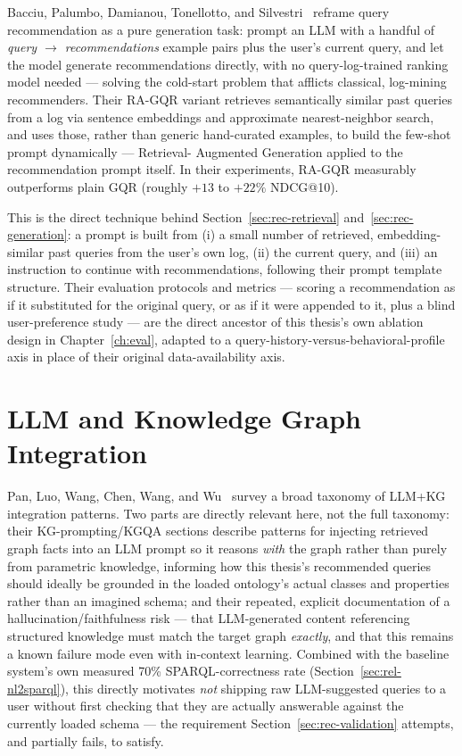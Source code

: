 Bacciu, Palumbo, Damianou, Tonellotto, and Silvestri~\cite{bacciu2024} reframe query recommendation
as a pure generation task: prompt an LLM with a handful of \emph{query $\to$ recommendations}
example pairs plus the user's current query, and let the model generate recommendations directly,
with no query-log-trained ranking model needed --- solving the cold-start problem that afflicts
classical, log-mining recommenders. Their RA-GQR variant retrieves semantically similar past
queries from a log via sentence embeddings and approximate nearest-neighbor search, and uses those,
rather than generic hand-curated examples, to build the few-shot prompt dynamically --- Retrieval-
Augmented Generation applied to the recommendation prompt itself. In their experiments, RA-GQR
measurably outperforms plain GQR (roughly $+13$ to $+22\%$ NDCG@10).

This is the direct technique behind Section~\ref{sec:rec-retrieval} and~\ref{sec:rec-generation}: a
prompt is built from (i) a small number of retrieved, embedding-similar past queries from the
user's own log, (ii) the current query, and (iii) an instruction to continue with recommendations,
following their prompt template structure. Their evaluation protocols and metrics --- scoring a
recommendation as if it substituted for the original query, or as if it were appended to it, plus
a blind user-preference study --- are the direct ancestor of this thesis's own ablation design in
Chapter~\ref{ch:eval}, adapted to a query-history-versus-behavioral-profile axis in place of their
original data-availability axis.

\section{LLM and Knowledge Graph Integration}
\label{sec:rel-kgllm}

Pan, Luo, Wang, Chen, Wang, and Wu~\cite{pan2024} survey a broad taxonomy of LLM+KG integration
patterns. Two parts are directly relevant here, not the full taxonomy: their KG-prompting/KGQA
sections describe patterns for injecting retrieved graph facts into an LLM prompt so it reasons
\emph{with} the graph rather than purely from parametric knowledge, informing how this thesis's
recommended queries should ideally be grounded in the loaded ontology's actual classes and
properties rather than an imagined schema; and their repeated, explicit documentation of a
hallucination/faithfulness risk --- that LLM-generated content referencing structured knowledge
must match the target graph \emph{exactly}, and that this remains a known failure mode even with
in-context learning. Combined with the baseline system's own measured 70\% SPARQL-correctness rate
(Section~\ref{sec:rel-nl2sparql}), this directly motivates \emph{not} shipping raw LLM-suggested
queries to a user without first checking that they are actually answerable against the currently
loaded schema --- the requirement Section~\ref{sec:rec-validation} attempts, and partially fails,
to satisfy.

